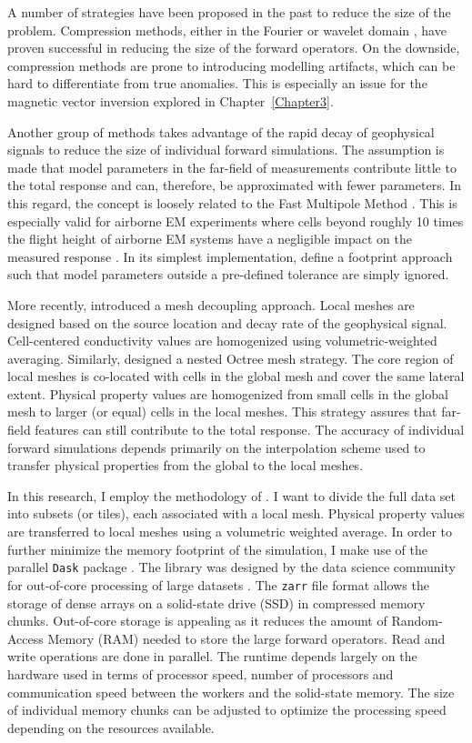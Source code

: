 A number of strategies have been proposed in the past to reduce the size of the problem. Compression methods, either in the Fourier \cite[]{Pilkington97} or wavelet domain \cite[]{LiOldenburg03}, have proven successful in reducing the size of the forward operators. On the downside, compression methods are prone to introducing modelling artifacts, which can be hard to differentiate from true anomalies. This is especially an issue for the magnetic vector inversion explored in Chapter~\ref{Chapter3}.

Another group of methods takes advantage of the rapid decay of geophysical signals to reduce the size of individual forward simulations. The assumption is made that model parameters in the far-field of measurements contribute little to the total response and can, therefore, be approximated with fewer parameters. In this regard, the concept is loosely related to the Fast Multipole Method \cite[]{Engheta1992}. This is especially valid for airborne EM experiments where cells beyond roughly 10 times the flight height of airborne EM systems have a negligible impact on the measured response \cite[]{Reid2006}. In its simplest implementation, \cite{Cox2010} define a footprint approach such that model parameters outside a pre-defined tolerance are simply ignored.

More recently, \cite{Yang2014} introduced a mesh decoupling approach. Local meshes are designed based on the source location and decay rate of the geophysical signal. Cell-centered conductivity values are homogenized using volumetric-weighted averaging. Similarly, \cite{Haber2014} designed a nested Octree mesh strategy. The core region of local meshes is co-located with cells in the global mesh and cover the same lateral extent. Physical property values are homogenized from small cells in the global mesh to larger (or equal) cells in the local meshes. This strategy assures that far-field features can still contribute to the total response. The accuracy of individual forward simulations depends primarily on the interpolation scheme used to transfer physical properties from the global to the local meshes.

In this research, I employ the methodology of \cite{Haber2014}. I want to divide the full data set into subsets (or tiles), each associated with a local mesh. Physical property values are transferred to local meshes using a volumetric weighted average. In order to further minimize the memory footprint of the simulation, I make use of the parallel \texttt{Dask} package \cite[]{dask2016}. The library was designed by the data science community for out-of-core processing of large datasets \cite[]{Scipy2015}. The \texttt{zarr} file format allows the storage of dense arrays on a solid-state drive (SSD) in compressed memory chunks. Out-of-core storage is appealing as it reduces the amount of Random-Access Memory (RAM) needed to store the large forward operators. Read and write operations are done in parallel. The runtime depends largely on the hardware used in terms of processor speed, number of processors and communication speed between the workers and the solid-state memory. The size of individual memory chunks can be adjusted to optimize the processing speed depending on the resources available.

